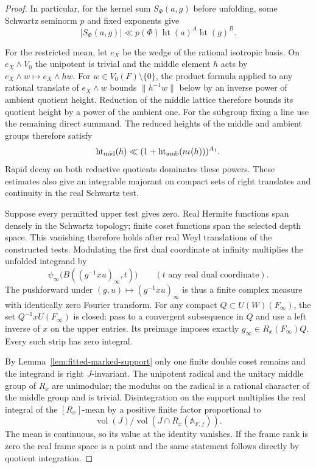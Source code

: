 \begin{proof}
In particular, for the kernel sum \(S_\Phi(a,g)\) before unfolding, some Schwartz seminorm \(p\) and fixed exponents give
\[
 |S_\Phi(a,g)|\ll p(\Phi)\operatorname{ht}(a)^A
                               \operatorname{ht}(g)^B .
\]

For the restricted mean, let \(e_X\) be the wedge of the rational
isotropic basis. On \(e_X\wedge V_0\) the unipotent is trivial
and the middle element \(h\) acts by \(e_X\wedge w\mapsto
e_X\wedge hw\). For \(w\in V_0(F)\setminus\{0\}\), the product
formula applied to any rational translate of \(e_X\wedge w\) bounds
\(\|h^{-1}w\|\) below by an inverse power of ambient quotient height.
Reduction of the middle lattice therefore bounds its quotient height
by a power of the ambient one. For the subgroup fixing a line use
the remaining direct summand. The reduced heights of the middle and ambient groups therefore satisfy
\[
 \operatorname{ht}_{\rm mid}(h)\ll(1+\operatorname{ht}_{\rm amb}(n\iota(h)))^{A_1}.
\]
Rapid decay on both reductive quotients dominates these powers. These estimates also
give an integrable majorant on compact sets of right translates
and continuity in the real Schwartz test.

Suppose every permitted upper test gives zero. Real Hermite functions
span densely in the Schwartz topology; finite coset functions span
the selected depth space. This vanishing therefore holds after real
Weyl translations of the constructed tests. Modulating the first
dual coordinate at infinity multiplies the unfolded integrand by
\[
       \psi_\infty\big(B((g^{-1}xu)_\infty,t)\big)
       \qquad(t\text{ any real dual coordinate}).
\]
The pushforward under \((g,u)\mapsto(g^{-1}xu)_\infty\) is thus a finite
complex measure with identically zero Fourier transform. For any
compact \(Q\subset U(W)(F_\infty)\), the set \(Q^{-1}xU(F_\infty)\)
is closed: pass to a convergent subsequence in \(Q\) and use a left
inverse of \(x\) on the upper entries. Its preimage imposes exactly
\(g_\infty\in R_x(F_\infty)Q\). Every such strip has zero integral.

By Lemma~\ref{lem:fitted-marked-support} only one finite double
coset remains and the integrand is right \(J\)-invariant.
The unipotent radical and the unitary middle group of \(R_x\) are
unimodular; the modulus on the radical is a rational character of
the middle group and is trivial. Disintegration on the support
multiplies the real integral of the \([R_x]\)-mean by a positive
finite factor proportional to
\[
   \operatorname{vol}(J)/
   \operatorname{vol}(J\cap R_x(\mathbb A_{F,f})).
\]
The mean is continuous, so its value at the identity vanishes.
If the frame rank is zero the real frame space is a point and
the same statement follows directly by quotient integration.


\end{proof}
